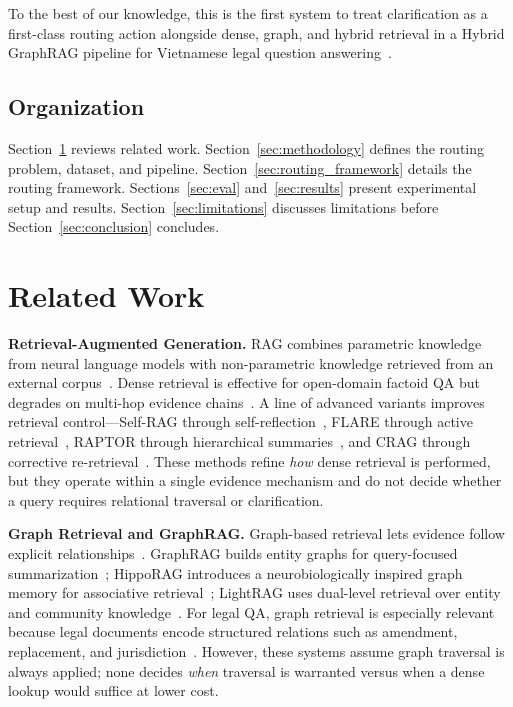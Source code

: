 ﻿\documentclass[11pt,twocolumn]{article}
\begin{document}
To the best of our knowledge, this is the first system to treat
clarification as a first-class routing action alongside dense, graph, and
hybrid retrieval in a Hybrid GraphRAG pipeline for Vietnamese legal
question answering~\cite{sovrano2020legalkg,zhong2020nlp_law}.

\subsection{Organization}

Section~\ref{sec:related_work} reviews related work.
Section~\ref{sec:methodology} defines the routing problem, dataset,
and pipeline. Section~\ref{sec:routing_framework} details the routing
framework. Sections~\ref{sec:eval} and~\ref{sec:results} present
experimental setup and results. Section~\ref{sec:limitations}
discusses limitations before Section~\ref{sec:conclusion} concludes.

\section{Related Work}
\label{sec:related_work}

\textbf{Retrieval-Augmented Generation.}
RAG combines parametric knowledge from neural language models with
non-parametric knowledge retrieved from an external
corpus~\cite{lewis2020rag,guu2020realm}. Dense retrieval is effective for
open-domain factoid QA but degrades on multi-hop evidence
chains~\cite{karpukhin2020dpr,trivedi2023interleaving}. A line of advanced
variants improves retrieval control---Self-RAG through
self-reflection~\cite{asai2023selfrag}, FLARE through active
retrieval~\cite{jiang2023flare}, RAPTOR through hierarchical
summaries~\cite{sarthi2024raptor}, and CRAG through corrective
re-retrieval~\cite{yan2024corrective}. These methods refine \emph{how}
dense retrieval is performed, but they operate within a single evidence
mechanism and do not decide whether a query requires relational traversal
or clarification.

\textbf{Graph Retrieval and GraphRAG.}
Graph-based retrieval lets evidence follow explicit
relationships~\cite{sun2019pullnet,wang2024kgp}. GraphRAG builds entity
graphs for query-focused summarization~\cite{edge2024graphrag}; HippoRAG
introduces a neurobiologically inspired graph memory for associative
retrieval~\cite{gutierrez2024hipporag}; LightRAG uses dual-level retrieval
over entity and community knowledge~\cite{he2024lightrag}. For legal QA,
graph retrieval is especially relevant because legal documents encode
structured relations such as amendment, replacement, and
jurisdiction~\cite{sovrano2020legalkg}. However, these systems assume
graph traversal is always applied; none decides \emph{when} traversal is
warranted versus when a dense lookup would suffice at lower cost.
\end{document}
